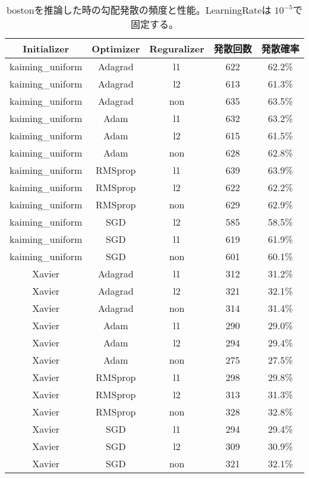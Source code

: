 \begin{table}[htbp]
    \begin{center}
        \caption{bostonを推論した時の勾配発散の頻度と性能。LearningRateは $ 10^{-5} $で固定する。 }
        \label{appendix:errorcount_table}
        \vspace{2mm} 
        \begin{tabular}{ |c|c|c|c|c| }
        \hline
        Initializer & Optimizer &  Reguralizer & 発散回数 & 発散確率 \\
        \hline
        kaiming\_uniform & Adagrad & l1 & 622 & 62.2\% \\
        \hline
        kaiming\_uniform & Adagrad & l2 & 613 & 61.3\% \\
        \hline
        kaiming\_uniform & Adagrad & non & 635 & 63.5\% \\
        \hline
        kaiming\_uniform & Adam & l1 & 632 & 63.2\% \\
        \hline
        kaiming\_uniform & Adam & l2 & 615 & 61.5\% \\
        \hline
        kaiming\_uniform & Adam & non & 628 & 62.8\% \\
        \hline
        kaiming\_uniform & RMSprop & l1 & 639 & 63.9\% \\
        \hline
        kaiming\_uniform & RMSprop & l2 & 622 & 62.2\% \\
        \hline
        kaiming\_uniform & RMSprop & non & 629 & 62.9\% \\
        \hline
        kaiming\_uniform & SGD & l2 & 585 & 58.5\% \\
        \hline
        kaiming\_uniform & SGD & l1 & 619 & 61.9\% \\
        \hline
        kaiming\_uniform & SGD & non & 601 & 60.1\% \\
        \hline
        Xavier & Adagrad & l1 & 312 & 31.2\% \\
        \hline
        Xavier & Adagrad & l2 & 321 & 32.1\% \\
        \hline
        Xavier & Adagrad & non & 314 & 31.4\% \\
        \hline
        Xavier & Adam & l1 & 290 & 29.0\% \\
        \hline
        Xavier & Adam & l2 & 294 & 29.4\% \\
        \hline
        Xavier & Adam & non & 275 & 27.5\% \\
        \hline
        Xavier & RMSprop & l1 & 298 & 29.8\% \\
        \hline
        Xavier & RMSprop & l2 & 313 & 31.3\% \\
        \hline
        Xavier & RMSprop & non & 328 & 32.8\% \\
        \hline
        Xavier & SGD & l1 & 294 & 29.4\% \\
        \hline
        Xavier & SGD & l2 & 309 & 30.9\% \\
        \hline
        Xavier & SGD & non & 321 & 32.1\% \\
        \hline
        \end{tabular}
    \end{center}
\end{table}
